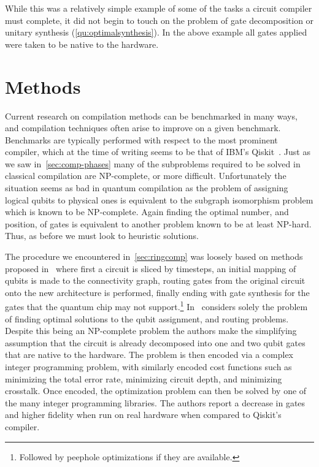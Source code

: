 While this was a relatively simple example of some of the tasks a circuit compiler must complete, it did not begin to touch on the problem of gate decomposition or unitary synthesis (\cref{qu:optimalsynthesis}).
In the above example all gates applied were taken to be native to the hardware.


\section{Methods}\label{sec:methods}

Current research on compilation methods can be benchmarked in many ways, and compilation techniques often arise to improve on a given benchmark.
Benchmarks are typically performed with respect to the most prominent compiler, which at the time of writing seems to be that of IBM's Qiskit~\cite{qiskit}.
Just as we saw in~\cref{sec:comp-phases} many of the subproblems required to be solved in classical compilation are NP-complete, or more difficult.
Unfortunately the situation seems as bad in quantum compilation as the problem of assigning logical qubits to physical ones is equivalent to the subgraph isomorphism problem which is known to be NP-complete.
Again finding the optimal number, and position, of \SWAP{} gates is equivalent to another problem known to be at least NP-hard.
Thus, as before we must look to heuristic solutions.

The procedure we encountered in~\cref{sec:ringcomp} was loosely based on methods proposed in~\cite{ring-compilation} where first a circuit is sliced by timesteps, an initial mapping of qubits is made to the connectivity graph, routing gates from the original circuit onto the new architecture is performed, finally ending with gate synthesis for the gates that the quantum chip may not support.\footnote{Followed by peephole optimizations if they are available.}
In~\cite{intprog} considers solely the problem of finding optimal solutions to the qubit assignment, and routing problems.
Despite this being an NP-complete problem the authors make the simplifying assumption that the circuit is already decomposed into one and two qubit gates that are native to the hardware.
The problem is then encoded via a complex integer programming problem, with similarly encoded cost functions such as minimizing the total error rate, minimizing circuit depth, and minimizing crosstalk.
Once encoded, the optimization problem can then be solved by one of the many integer programming libraries.
The authors report a decrease in \CNOT{} gates and higher fidelity when run on real hardware when compared to Qiskit's compiler.

